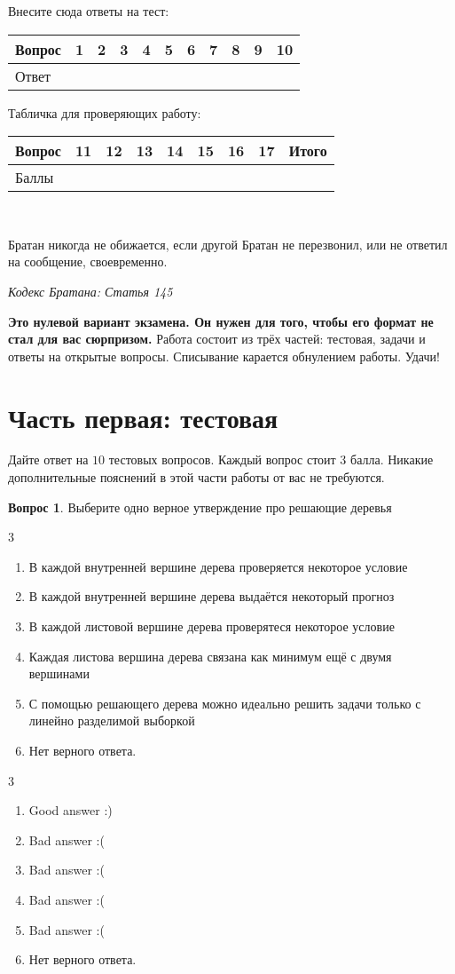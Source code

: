 \documentclass[12pt]{article}
\def \putyourname{\fbox{
    \begin{minipage}{42em}
      Фамилия, имя, номер группы:\vspace*{3ex}\par
      \noindent\dotfill\vspace{2mm}
    \end{minipage}
  }
}
\def \checktable{

  \vspace{5pt}
  Табличка для проверяющих работу:

\vspace{5pt}

  \begin{tabular}{|m{2cm}|m{1cm}|m{1cm}|m{1cm}|m{1cm}|m{1cm}|m{1cm}|m{1cm}|m{2cm}|}
\toprule
    Вопрос & 11 &  12 & 13 & 14 & 15 & 16 & 17 & Итого \\
\midrule
    Баллы &  &  & & & & & &  \\
 \bottomrule
\end{tabular}
}
\def \testtable{

\vspace{5pt}
  Внесите сюда ответы на тест:

\vspace{5pt}

\begin{tabular}{|m{2cm}|m{0.6cm}|m{0.6cm}|m{0.6cm}|m{0.6cm}|m{0.6cm}|m{0.6cm}|m{0.6cm}|m{0.6cm}|m{0.6cm}|m{0.6cm}|}
\toprule
    Вопрос & 1 &  2 & 3 & 4 & 5 & 6 & 7 & 8 & 9 & 10 \\
\midrule
    Ответ &  &  & & & & & & & & \\
 \bottomrule
\end{tabular}
}
\newenvironment{answerlist}[1][3]{
\begin{multicols}{#1}

\begin{enumerate}[label=\fbox{\emph{\Alph*}},ref=\emph{\alph*}]
}
{
\item Нет верного ответа.
\end{enumerate}
\end{multicols}
}
\theoremstyle{definition}
\newtheorem{question}{Вопрос}
\begin{document}
\putyourname

\testtable

\checktable

\mbox{ }

\epigraph{Братан никогда не обижается, если другой Братан не перезвонил, или не ответил на сообщение, своевременно.}{\textit{Кодекс Братана: Статья 145}}

\textbf{Это нулевой вариант экзамена. Он нужен для того, чтобы его формат не стал для вас сюрпризом.} Работа состоит из трёх частей: тестовая, задачи и ответы на открытые вопросы. Списывание карается обнулением работы. Удачи!

\section*{Часть первая: тестовая} 

Дайте ответ на $10$ тестовых вопросов. Каждый вопрос стоит $3$ балла. Никакие дополнительные пояснений в этой части работы от вас не требуются.

\begin{question}
Выберите одно верное утверждение про решающие деревья
\begin{answerlist}
  \item  В каждой внутренней вершине дерева проверяется некоторое условие
  \item  В каждой внутренней вершине дерева выдаётся некоторый прогноз
  \item  В каждой листовой вершине дерева проверятеся некоторое условие
  \item  Каждая листова вершина дерева связана как минимум ещё с двумя вершинами
  \item  С помощью решающего дерева можно идеально решить задачи только с линейно разделимой выборкой 
\end{answerlist}
\end{question}

\begin{solution}
\begin{answerlist}
  \item Good answer :)
  \item Bad answer :(
  \item Bad answer :(
  \item Bad answer :(
  \item Bad answer :(
\end{answerlist}
\end{solution}
\end{document}
